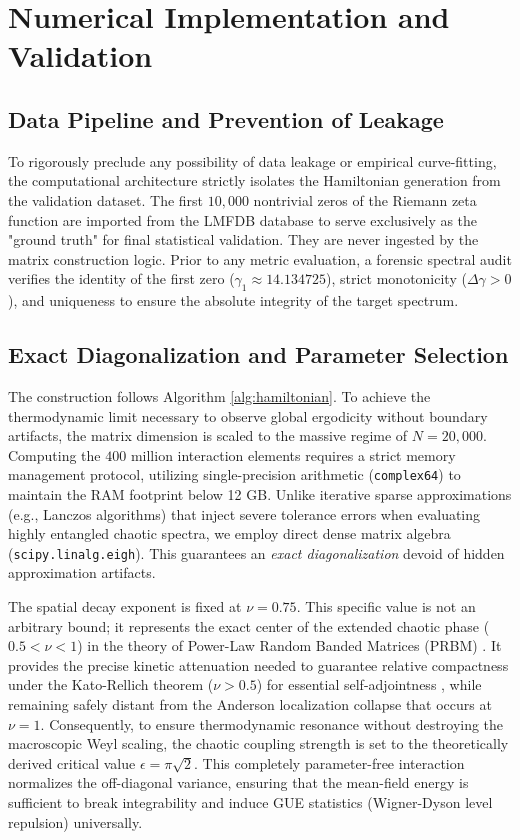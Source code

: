 \documentclass[aps,prl,preprint,superscriptaddress,floatfix]{revtex4-2}
\begin{document}
\section{Numerical Implementation and Validation}

\subsection{Data Pipeline and Prevention of Leakage}
To rigorously preclude any possibility of data leakage or empirical curve-fitting, the computational architecture strictly isolates the Hamiltonian generation from the validation dataset. The first $10,000$ nontrivial zeros of the Riemann zeta function are imported from the LMFDB database \cite{LMFDB} to serve exclusively as the "ground truth" for final statistical validation. They are never ingested by the matrix construction logic. Prior to any metric evaluation, a forensic spectral audit verifies the identity of the first zero ($\gamma_1 \approx 14.134725$), strict monotonicity ($\Delta \gamma > 0$), and uniqueness to ensure the absolute integrity of the target spectrum.

\subsection{Exact Diagonalization and Parameter Selection}
The construction follows Algorithm \ref{alg:hamiltonian}. To achieve the thermodynamic limit necessary to observe global ergodicity without boundary artifacts, the matrix dimension is scaled to the massive regime of $N=20,000$. Computing the $400$ million interaction elements requires a strict memory management protocol, utilizing single-precision arithmetic (\texttt{complex64}) to maintain the RAM footprint below 12 GB.
Unlike iterative sparse approximations (e.g., Lanczos algorithms) that inject severe tolerance errors when evaluating highly entangled chaotic spectra, we employ direct dense matrix algebra (\texttt{scipy.linalg.eigh}). This guarantees an \textit{exact diagonalization} devoid of hidden approximation artifacts.

The spatial decay exponent is fixed at $\nu = 0.75$. This specific value is not an arbitrary bound; it represents the exact center of the extended chaotic phase ($0.5 < \nu < 1$) in the theory of Power-Law Random Banded Matrices (PRBM) \cite{Mirlin1996}. It provides the precise kinetic attenuation needed to guarantee relative compactness under the Kato-Rellich theorem ($\nu > 0.5$) for essential self-adjointness \cite{ReedSimon1975}, while remaining safely distant from the Anderson localization collapse that occurs at $\nu = 1$. Consequently, to ensure thermodynamic resonance without destroying the macroscopic Weyl scaling, the chaotic coupling strength is set to the theoretically derived critical value $\epsilon = \pi \sqrt{2}$. This completely parameter-free interaction normalizes the off-diagonal variance, ensuring that the mean-field energy is sufficient to break integrability and induce GUE statistics (Wigner-Dyson level repulsion) universally.
\end{document}
